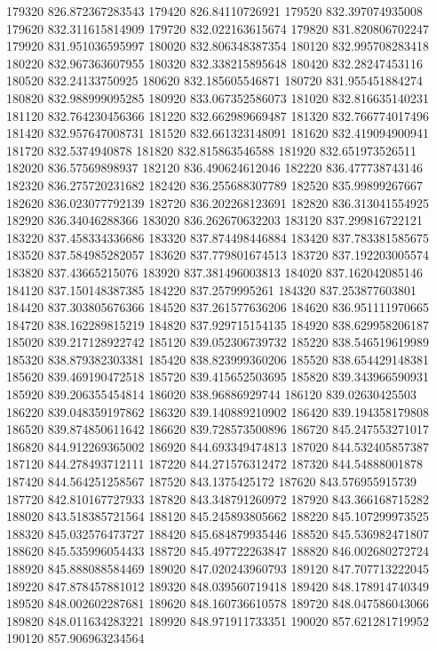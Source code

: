 {179320 826.872367283543
179420 826.84110726921
179520 832.397074935008
179620 832.311615814909
179720 832.022163615674
179820 831.820806702247
179920 831.951036595997
180020 832.806348387354
180120 832.995708283418
180220 832.967363607955
180320 832.338215895648
180420 832.28247453116
180520 832.24133750925
180620 832.185605546871
180720 831.955451884274
180820 832.988999095285
180920 833.067352586073
181020 832.816635140231
181120 832.764230456366
181220 832.662989669487
181320 832.766774017496
181420 832.957647008731
181520 832.661323148091
181620 832.419094900941
181720 832.5374940878
181820 832.815863546588
181920 832.651973526511
182020 836.57569898937
182120 836.490624612046
182220 836.477738743146
182320 836.275720231682
182420 836.255688307789
182520 835.99899267667
182620 836.023077792139
182720 836.202268123691
182820 836.313041554925
182920 836.34046288366
183020 836.262670632203
183120 837.299816722121
183220 837.458334336686
183320 837.874498446884
183420 837.783381585675
183520 837.584985282057
183620 837.779801674513
183720 837.192203005574
183820 837.43665215076
183920 837.381496003813
184020 837.162042085146
184120 837.150148387385
184220 837.2579995261
184320 837.253877603801
184420 837.303805676366
184520 837.261577636206
184620 836.951111970665
184720 838.162289815219
184820 837.929715154135
184920 838.629958206187
185020 839.217128922742
185120 839.052306739732
185220 838.546519619989
185320 838.879382303381
185420 838.823999360206
185520 838.654429148381
185620 839.469190472518
185720 839.415652503695
185820 839.343966590931
185920 839.206355454814
186020 838.96886929744
186120 839.02630425503
186220 839.048359197862
186320 839.140889210902
186420 839.194358179808
186520 839.874850611642
186620 839.728573500896
186720 845.247553271017
186820 844.912269365002
186920 844.693349474813
187020 844.532405857387
187120 844.278493712111
187220 844.271576312472
187320 844.54888001878
187420 844.564251258567
187520 843.1375425172
187620 843.576955915739
187720 842.810167727933
187820 843.348791260972
187920 843.366168715282
188020 843.518385721564
188120 845.245893805662
188220 845.107299973525
188320 845.032576473727
188420 845.684879935446
188520 845.536982471807
188620 845.535996054433
188720 845.497722263847
188820 846.002680272724
188920 845.888088584469
189020 847.020243960793
189120 847.707713222045
189220 847.878457881012
189320 848.039560719418
189420 848.178914740349
189520 848.002602287681
189620 848.160736610578
189720 848.047586043066
189820 848.011634283221
189920 848.971911733351
190020 857.621281719952
190120 857.906963234564
}

